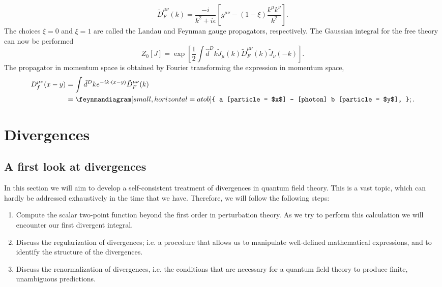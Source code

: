 \documentclass{article}
\numberwithin{equation}{section}
\begin{document}
\begin{equation}
    \tilde{D}_F^{\mu\nu}(k) = \frac{-i}{k^2+i\epsilon}\left[g^{\mu\nu} - (1-\xi)\frac{k^\mu k^\nu}{k^2}\right].
\end{equation}
The choices $\xi = 0$ and $\xi = 1$ are called the Landau and Feynman gauge propagators, respectively. The Gaussian integral for the free theory can now be performed 
\begin{equation}
    Z_0[J] = \exp\left[\frac{1}{2}\int \hat{d}^Dk \tilde{J}_\mu(k) \tilde{D}_F^{\mu\nu}(k) \tilde{J}_\nu(-k)\right].
\end{equation}
The propagator in momentum space is obtained by Fourier transforming the expression in momentum space, 
\begin{equation}
\begin{aligned}
    D_f^{\mu\nu}(x-y) &= \int \hat{d}^Dk e^{-ik \cdot (x-y)} \tilde{D}_F^{\mu\nu}(k) \\
    &= \feynmandiagram[small, horizontal=a to b]{
        a [particle = $x$] -- [photon] b [particle = $y$],
    };.
\end{aligned}
\end{equation}

\section{Divergences}

\subsection{A first look at divergences}

In this section we will aim to develop a self-consistent treatment of divergences in quantum field theory. This is a vast topic, which can hardly be addressed exhaustively in the time that we have. Therefore, we will follow the following steps:
\begin{enumerate}
    \item Compute the scalar two-point function beyond the first order in perturbation theory. As we try to perform this calculation we will encounter our first divergent integral.
    \item Discuss the regularization of divergences; i.e. a procedure that allows us to manipulate well-defined mathematical expressions, and to identify the structure of the divergences.
    \item Discuss the renormalization of divergences, i.e. the conditions that are necessary for a quantum field theory to produce finite, unambiguous predictions.
\end{enumerate}
\end{document}

